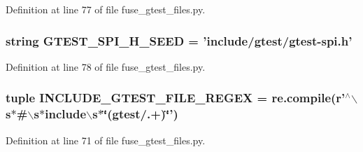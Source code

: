 \-Definition at line 77 of file fuse\-\_\-gtest\-\_\-files.\-py.

\hypertarget{namespacefuse__gtest__files_a77159a6461aab0da30373554620c18fc}{
\subsubsection[{\-G\-T\-E\-S\-T\-\_\-\-S\-P\-I\-\_\-\-H\-\_\-\-S\-E\-E\-D}]{\setlength{\rightskip}{0pt plus 5cm}string {\bf \-G\-T\-E\-S\-T\-\_\-\-S\-P\-I\-\_\-\-H\-\_\-\-S\-E\-E\-D} = 'include/gtest/gtest-\/spi.\-h'}}\label{d3/dfa/namespacefuse__gtest__files_a77159a6461aab0da30373554620c18fc}


\-Definition at line 78 of file fuse\-\_\-gtest\-\_\-files.\-py.

\hypertarget{namespacefuse__gtest__files_a983f29a677c2102ca37cd2569fce51da}{
\subsubsection[{\-I\-N\-C\-L\-U\-D\-E\-\_\-\-G\-T\-E\-S\-T\-\_\-\-F\-I\-L\-E\-\_\-\-R\-E\-G\-E\-X}]{\setlength{\rightskip}{0pt plus 5cm}tuple {\bf \-I\-N\-C\-L\-U\-D\-E\-\_\-\-G\-T\-E\-S\-T\-\_\-\-F\-I\-L\-E\-\_\-\-R\-E\-G\-E\-X} = re.\-compile(r'$^\wedge$$\backslash$s$\ast$\#$\backslash$s$\ast$include$\backslash$s$\ast$\char`\"{}(gtest/.+)\char`\"{}')}}\label{d3/dfa/namespacefuse__gtest__files_a983f29a677c2102ca37cd2569fce51da}


\-Definition at line 71 of file fuse\-\_\-gtest\-\_\-files.\-py.

